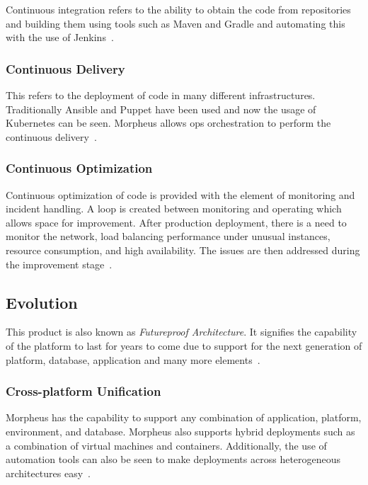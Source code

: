 Continuous integration refers to the ability to obtain the code from 
repositories and building them using tools such as Maven and Gradle and 
automating this with the use of 
Jenkins~\cite{hid-sp18-416-www-morpheus-automation}.

\subsubsection{Continuous Delivery}

This refers to the deployment of code in many different infrastructures. 
Traditionally Ansible and Puppet have been used and now the usage of Kubernetes 
can be seen. Morpheus allows ops orchestration to perform the continuous 
delivery~\cite{hid-sp18-416-www-morpheus-automation}.

\subsubsection{Continuous Optimization}

Continuous optimization of code is provided with the element of monitoring and 
incident handling. A loop is created between monitoring and operating 
which allows space for improvement. After production deployment, there is a 
need to monitor the network, load balancing performance under unusual 
instances, resource consumption, and high availability. The issues are then 
addressed during the improvement 
stage~\cite{hid-sp18-416-www-morpheus-automation}.

\subsection{Evolution}

This product is also known as \textit{Futureproof Architecture}. It signifies 
the capability of the platform to last for years to come due to support for 
the next generation of platform, database, application and many more 
elements~\cite{hid-sp18-416-www-morpheus-product-guide}.

\subsubsection{Cross-platform Unification}

Morpheus has the capability to support any combination of application, 
platform, environment, and database. Morpheus also supports hybrid deployments 
such as a combination of virtual machines and containers. Additionally, the use 
of automation tools can also be seen to make deployments across heterogeneous 
architectures easy~\cite{hid-sp18-416-www-morpheus-architecture}.

